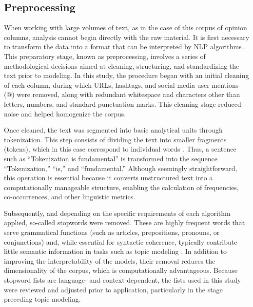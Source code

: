 \documentclass[pdflatex,sn-mathphys-num, iicol]{sn-jnl}
\begin{document}
	
	\subsection{Preprocessing}\label{subsec:preprocessing}
	
	When working with large volumes of text, as in the case of this corpus of opinion columns, analysis cannot begin directly with the raw material. It is first necessary to transform the data into a format that can be interpreted by NLP algorithms \cite{Chai2022}. This preparatory stage, known as preprocessing, involves a series of methodological decisions aimed at cleaning, structuring, and standardizing the text prior to modeling. In this study, the procedure began with an initial cleaning of each column, during which URLs, hashtags, and social media user mentions (@) were removed, along with redundant whitespace and characters other than letters, numbers, and standard punctuation marks. This cleaning stage reduced noise and helped homogenize the corpus.
	
	Once cleaned, the text was segmented into basic analytical units through tokenization. This step consists of dividing the text into smaller fragments (tokens), which in this case correspond to individual words \cite{Tyagi_text}. Thus, a sentence such as ``Tokenization is fundamental'' is transformed into the sequence ``Tokenization,'' ``is,'' and ``fundamental.'' Although seemingly straightforward, this operation is essential because it converts unstructured text into a computationally manageable structure, enabling the calculation of frequencies, co-occurrences, and other linguistic metrics.
	
	Subsequently, and depending on the specific requirements of each algorithm applied, so-called stopwords were removed. These are highly frequent words that serve grammatical functions (such as articles, prepositions, pronouns, or conjunctions) and, while essential for syntactic coherence, typically contribute little semantic information in tasks such as topic modeling \cite{Siino2024}. In addition to improving the interpretability of the models, their removal reduces the dimensionality of the corpus, which is computationally advantageous. Because stopword lists are language- and context-dependent, the lists used in this study were reviewed and adjusted prior to application, particularly in the stage preceding topic modeling.
	
\end{document}
